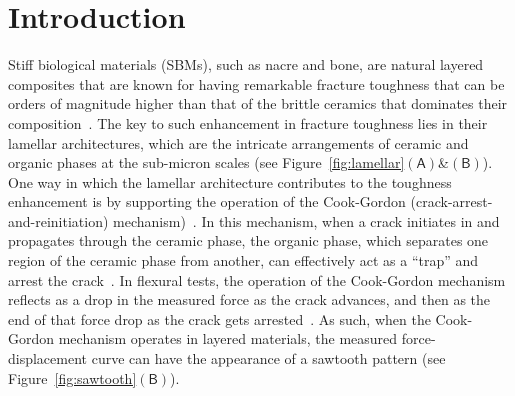 \documentclass[preprint,10pt,times]{elsarticle}
\numberwithin{equation}{section}
\newcommand{\pr}[1]{\left( #1 \right)}
\newcommand{\subf}[1]{\pr{\textsf{#1}}}
\begin{document}

\section{Introduction\label{sec:Introduction}}

Stiff biological materials (SBMs), such as nacre and bone, are natural
layered composites that are known for having remarkable fracture toughness
that can be orders of magnitude higher than that of the brittle ceramics
that dominates their composition~\cite{jackson1988mechanical,currey1977mechanical,sarikaya1994introduction,menig2000quasi,koester2008true,wegst2015bioinspired}.
The key to such enhancement in fracture toughness lies in their lamellar
architectures, which are the intricate arrangements of ceramic and
organic phases at the sub-micron scales (see Figure~\ref{fig:lamellar}$\subf{A}$\&$\subf{B}$).
One way in which the lamellar architecture contributes to the toughness
enhancement is by supporting the operation of the Cook-Gordon (crack-arrest-and-reinitiation)
mechanism)~\cite{cook1964mechanism}. In this mechanism, when a crack
initiates in and propagates through the ceramic phase, the organic
phase, which separates one region of the ceramic phase from another,
can effectively act as a \textquotedblleft trap\textquotedblright{}
and arrest the crack~\cite{ming1989crack,cook1964mechanism}. In
flexural tests, the operation of the Cook-Gordon mechanism reflects
as a drop in the measured force as the crack advances, and then as
the end of that force drop as the crack gets arrested~\cite{clegg1990simple}.
As such, when the Cook-Gordon mechanism operates in layered materials,
the measured force-displacement curve can have the appearance of a
sawtooth pattern (see Figure~\ref{fig:sawtooth}$\subf{B}$).
\end{document}
